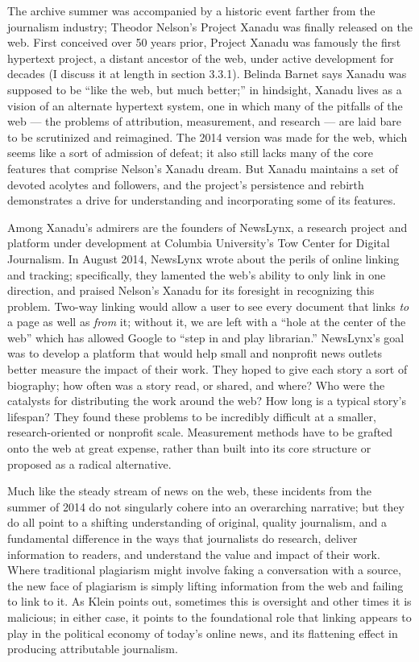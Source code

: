 The archive summer was accompanied by a historic event farther from the journalism industry; Theodor Nelson's Project Xanadu was finally released on the web. First conceived over 50 years prior, Project Xanadu was famously the first hypertext project, a distant ancestor of the web, under active development for decades (I discuss it at length in section 3.3.1). Belinda Barnet says Xanadu was supposed to be ``like the web, but much better;'' in hindsight, Xanadu lives as a vision of an alternate hypertext system, one in which many of the pitfalls of the web --- the problems of attribution, measurement, and research --- are laid bare to be scrutinized and reimagined.\autocite[``The Magical Place of Literary Memory: Xanadu'']{barnet_memory_2013} The 2014 version was made for the web, which seems like a sort of admission of defeat; it also still lacks many of the core features that comprise Nelson's Xanadu dream. But Xanadu maintains a set of devoted acolytes and followers, and the project's persistence and rebirth demonstrates a drive for understanding and incorporating some of its features.

Among Xanadu's admirers are the founders of NewsLynx, a research project and platform under development at Columbia University's Tow Center for Digital Journalism. In August 2014, NewsLynx wrote about the perils of online linking and tracking; specifically, they lamented the web's ability to only link in one direction, and praised Nelson's Xanadu for its foresight in recognizing this problem. Two-way linking would allow a user to see every document that links \emph{to} a page as well as \emph{from} it; without it, we are left with a ``hole at the center of the web'' which has allowed Google to ``step in and play librarian.''\autocite{abelson_hyper-compensation:_2014} NewsLynx's goal was to develop a platform that would help small and nonprofit news outlets better measure the impact of their work. They hoped to give each story a sort of biography; how often was a story read, or shared, and where? Who were the catalysts for distributing the work around the web? How long is a typical story's lifespan? They found these problems to be incredibly difficult at a smaller, research-oriented or nonprofit scale. Measurement methods have to be grafted onto the web at great expense, rather than built into its core structure or proposed as a radical alternative.

Much like the steady stream of news on the web, these incidents from the summer of 2014 do not singularly cohere into an overarching narrative; but they do all point to a shifting understanding of original, quality journalism, and a fundamental difference in the ways that journalists do research, deliver information to readers, and understand the value and impact of their work. Where traditional plagiarism might involve faking a conversation with a source, the new face of plagiarism is simply lifting information from the web and failing to link to it. As Klein points out, sometimes this is oversight and other times it is malicious; in either case, it points to the foundational role that linking appears to play in the political economy of today's online news, and its flattening effect in producing attributable journalism.

